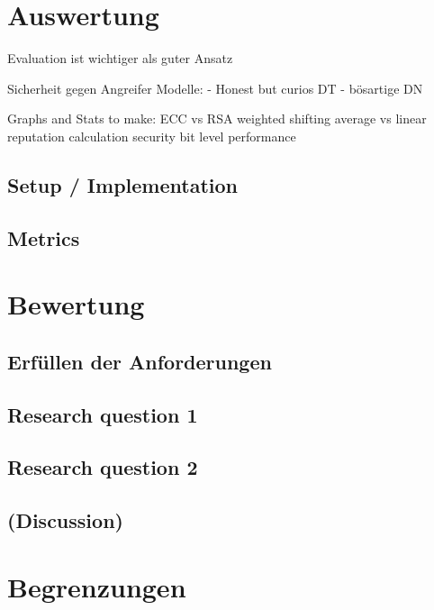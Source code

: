 \documentclass[11pt,a4paper]{scrreprt}
\begin{document}
\chapter{Auswertung}
Evaluation ist wichtiger als guter Ansatz

Sicherheit gegen Angreifer Modelle:
    - Honest but curios DT
    - bösartige DN



Graphs and Stats to make:
ECC vs RSA
weighted shifting average vs linear reputation calculation
security bit level performance

\section{Setup / Implementation}

\section{Metrics}



\chapter{Bewertung}

\section{Erfüllen der Anforderungen}

\section{Research question 1}

\section{Research question 2}

\section{(Discussion)}




\chapter{Begrenzungen}
\end{document}
